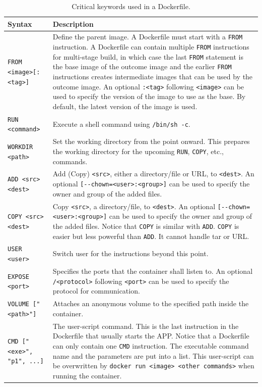 \begin{table}[!htbp]
	\centering \caption{Critical keywords used in a Dockerfile.}\label{ch:vac:tab:keywordsdockerfile}
	\begin{tabularx}{\textwidth}{lX}
		\hline
		Syntax & Description \\ \hline
		\verb|FROM <image>[:<tag>]| & Define the parent image. A Dockerfile must start with a \verb|FROM| instruction. A Dockerfile can contain multiple \verb|FROM| instructions for multi-stage build, in which case the last \verb|FROM| statement is the base image of the outcome image and the earlier \verb|FROM| instructions creates intermediate images that can be used by the outcome image. An optional \verb|:<tag>| following \verb|<image>| can be used to specify the version of the image to use as the base. By default, the latest version of the image is used. \\ 
		\verb|RUN <command>| & Execute a shell command using \verb|/bin/sh -c|. \\ 
		\verb|WORKDIR <path>| & Set the working directory from the point onward. This prepares the working directory for the upcoming \verb|RUN|, \verb|COPY|, etc., commands. \\ 
		\verb|ADD <src> <dest>| & Add (Copy) \verb|<src>|, either a directory/file or URL, to \verb|<dest>|. An optional \verb|[--chown=<user>:<group>]| can be used to specify the owner and group of the added files. \\ 
		\verb|COPY <src> <dest>| & Copy \verb|<src>|, a directory/file, to \verb|<dest>|. An optional \verb|[--chown=<user>:<group>]| can be used to specify the owner and group of the added files. Notice that \verb|COPY| is similar with \verb|ADD|. \verb|COPY| is easier but less powerful than \verb|ADD|. It cannot handle tar or URL. \\ 
		\verb|USER <user>| & Switch user for the instructions beyond this point. \\ 
		\verb|EXPOSE <port>| & Specifies the ports that the container shall listen to. An optional \verb|/<protocol>| following \verb|<port>| can be used to specify the protocol for communication. \\
        \verb|VOLUME ["<path>"]| & Attaches an anonymous volume to the specified path inside the container. \\
		\verb|CMD ["<exe>", "p1", ...]| & The user-script command. This is the last instruction in the Dockerfile that usually starts the APP. Notice that a Dockerfile can only contain one \verb|CMD| instruction. The executable command name and the parameters are put into a list. This user-script can be overwritten by \texttt{docker run <image> <other commands>} when running the container. \\
		\hline
	\end{tabularx}
\end{table}

